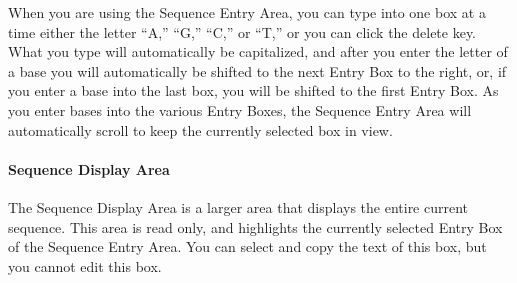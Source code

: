 \documentclass[titlepage]{article}
\begin{document}
When you are using the Sequence Entry Area, you can type into one box at a time either the letter ``A,'' ``G,'' ``C,'' or ``T,'' or you can click the delete key. What you type will automatically be capitalized, and after you enter the letter of a base you will automatically be shifted to the next Entry Box to the right, or, if you enter a base into the last box, you will be shifted to the first Entry Box. As you enter bases into the various Entry Boxes, the Sequence Entry Area will automatically scroll to keep the currently selected box in view.
	
\paragraph{Sequence Display Area}
The Sequence Display Area is a larger area that displays the entire current sequence. This area is read only, and highlights the currently selected Entry Box of the Sequence Entry Area. You can select and copy the text of this box, but you cannot edit this box.
\end{document}
